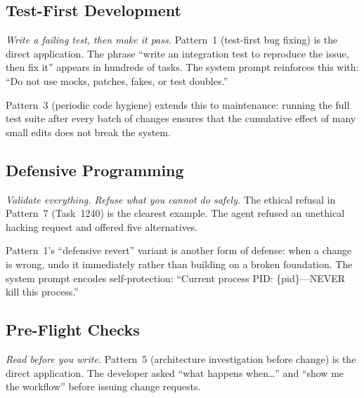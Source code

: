 \documentclass{article}
\begin{document}
\subsection{Test-First Development}
\label{sec:test-first}

\emph{Write a failing test, then make it pass.}
Pattern~1 (test-first bug fixing) is the direct application.
The phrase ``write an integration test to reproduce the issue, then
fix it'' appears in hundreds of tasks.
The system prompt reinforces this with: ``Do not use mocks, patches,
fakes, or test doubles.''

Pattern~3 (periodic code hygiene) extends this to maintenance:
running the full test suite after every batch of changes ensures
that the cumulative effect of many small edits does not break the
system.

\subsection{Defensive Programming}
\label{sec:defensive}

\emph{Validate everything.  Refuse what you cannot do safely.}
The ethical refusal in Pattern~7 (Task~1240) is the clearest example.
The agent refused an unethical hacking request and offered five
alternatives.

Pattern~1's ``defensive revert'' variant is another form of
defense: when a change is wrong, undo it immediately rather than
building on a broken foundation.
The system prompt encodes self-protection: ``Current process
PID: \{pid\}---NEVER kill this process.''

\subsection{Pre-Flight Checks}
\label{sec:preflight}

\emph{Read before you write.}
Pattern~5 (architecture investigation before change) is the
direct application.
The developer asked ``what happens when\ldots'' and ``show me
the workflow'' before issuing change requests.
\end{document}
